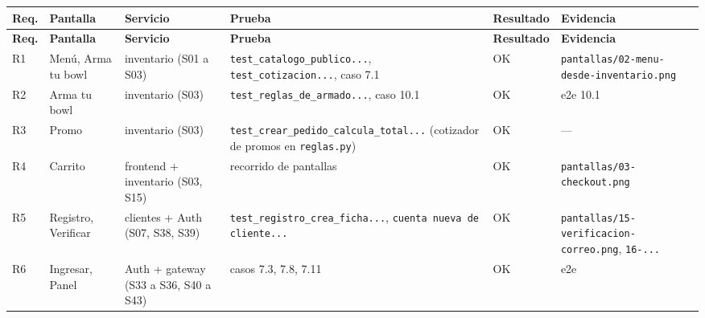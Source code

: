 {\footnotesize
\setlength{\tabcolsep}{3pt}\renewcommand{\arraystretch}{1.15}
\begin{longtable}{|>{\raggedright\arraybackslash}p{}|>{\raggedright\arraybackslash}p{}|>{\raggedright\arraybackslash}p{}|>{\raggedright\arraybackslash}p{}|>{\raggedright\arraybackslash}p{}|>{\raggedright\arraybackslash}p{}|}
\hline
\textbf{Req.} & \textbf{Pantalla} & \textbf{Servicio} & \textbf{Prueba} & \textbf{Resultado} & \textbf{Evidencia} \\ \hline
\endfirsthead
\hline
\textbf{Req.} & \textbf{Pantalla} & \textbf{Servicio} & \textbf{Prueba} & \textbf{Resultado} & \textbf{Evidencia} \\ \hline
\endhead
R1 & Menú, Arma tu bowl & inventario (S01 a S03) & \texttt{test\_\allowbreak{}catalogo\_\allowbreak{}publico.\allowbreak{}.\allowbreak{}.\allowbreak{}}, \texttt{test\_\allowbreak{}cotizacion.\allowbreak{}.\allowbreak{}.\allowbreak{}}, caso 7.1 & OK & \texttt{pantallas/\allowbreak{}02-\allowbreak{}menu-\allowbreak{}desde-\allowbreak{}inventario.\allowbreak{}png} \\ \hline
R2 & Arma tu bowl & inventario (S03) & \texttt{test\_\allowbreak{}reglas\_\allowbreak{}de\_\allowbreak{}armado.\allowbreak{}.\allowbreak{}.\allowbreak{}}, caso 10.1 & OK & e2e 10.1 \\ \hline
R3 & Promo & inventario (S03) & \texttt{test\_\allowbreak{}crear\_\allowbreak{}pedido\_\allowbreak{}calcula\_\allowbreak{}total.\allowbreak{}.\allowbreak{}.\allowbreak{}} (cotizador de promos en \texttt{reglas.\allowbreak{}py}) & OK & — \\ \hline
R4 & Carrito & frontend + inventario (S03, S15) & recorrido de pantallas & OK & \texttt{pantallas/\allowbreak{}03-\allowbreak{}checkout.\allowbreak{}png} \\ \hline
R5 & Registro, Verificar & clientes + Auth (S07, S38, S39) & \texttt{test\_\allowbreak{}registro\_\allowbreak{}crea\_\allowbreak{}ficha.\allowbreak{}.\allowbreak{}.\allowbreak{}}, \texttt{cuenta nueva de cliente.\allowbreak{}.\allowbreak{}.\allowbreak{}} & OK & \texttt{pantallas/\allowbreak{}15-\allowbreak{}verificacion-\allowbreak{}correo.\allowbreak{}png}, \texttt{16-\allowbreak{}.\allowbreak{}.\allowbreak{}.\allowbreak{}} \\ \hline
R6 & Ingresar, Panel & Auth + gateway (S33 a S36, S40 a S43) & casos 7.3, 7.8, 7.11 & OK & e2e \\ \hline

\end{longtable}}
